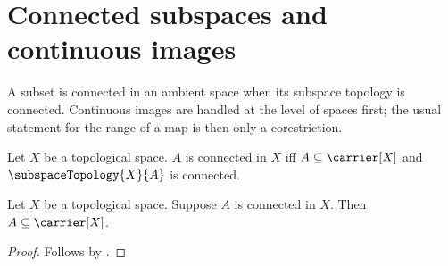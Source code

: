 \section{Connected subspaces and continuous images}




A subset is connected in an ambient space when its subspace topology is
connected.  Continuous images are handled at the level of spaces first; the
usual statement for the range of a map is then only a corestriction.

\begin{definition}\label{connected_in}
    Let $X$ be a topological space.
    $A$ is connected in $X$ iff
        $A\subseteq\carrier[X]$ and
        $\subspaceTopology{X}{A}$ is connected.
\end{definition}

\begin{proposition}\label{connected_in_subseteq_carrier}
    Let $X$ be a topological space.
    Suppose $A$ is connected in $X$.
    Then $A\subseteq\carrier[X]$.
\end{proposition}
\begin{proof}
    Follows by .
\end{proof}

